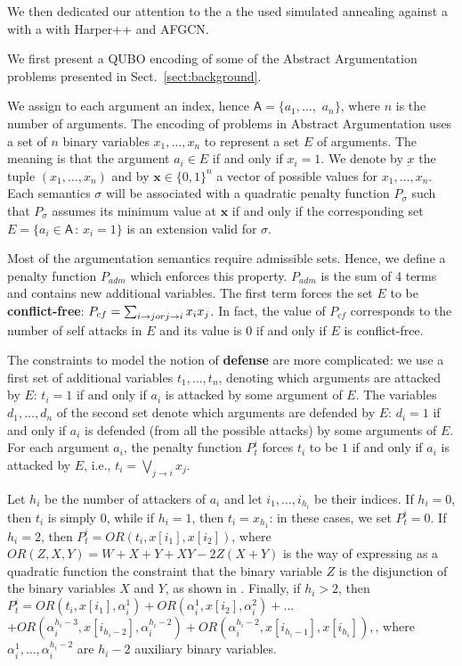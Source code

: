 \documentclass[conference]{IEEEtran}
\newcommand{\args}{\ensuremath{\mathsf{A}}\xspace} %
\newcommand{\atts}{\ensuremath{\rightarrow}\xspace}
\begin{document}
We then dedicated our attention to the 
 a the used simulated annealing against a with a with Harper++ and AFGCN. 

\iffalse
We first present a QUBO encoding of some of the Abstract Argumentation problems presented in Sect.~\ref{sect:background}. 

We assign to each argument an index, hence $\args=\{a_1,\dots,$ $a_n\}$, where $n$ is the number of arguments. The encoding of problems in Abstract Argumentation uses
a set of $n$ binary variables $x_1,\dots,x_n$ to represent a set $E$ of arguments.
The meaning is that the argument
$a_i\in E$ if and only if $x_i=1$. We denote by $\underbar{x}$ the tuple $(x_1,\dots,x_n)$
and by $\mathbf{x}\in\{0,1\}^n$ a vector of possible values for $x_1,\dots,x_n$.
Each semantics $\sigma$ will be associated with a quadratic penalty function $P_{\sigma}$ such that $P_{\sigma}$ assumes its minimum value at $\mathbf{x}$ if and only if the corresponding set $E=\{a_i\in \args \,:\, x_i=1\}$ is an extension valid for $\sigma$. 

Most of the argumentation semantics require admissible sets. Hence, we define a penalty function $P_{adm}$ which enforces this property. $P_{adm}$ is the sum of 4 terms and contains new additional variables.
The first term forces the set $E$ to be \textbf{conflict-free}:
$ P_{cf}=\sum_{i \atts j \mbox{ or }\\
	j \atts i} x_i x_j $. In fact, the value of $ P_{cf}$ corresponds to the number of self attacks in $E$
and its value is $0$ if and only if $E$ is conflict-free. 

The constraints to model the notion of \textbf{defense} are more complicated: we use a first set of additional variables $t_1,\dots,t_n$, denoting which arguments are attacked by $E$: $t_i=1$ if and only if $a_i$ is attacked by some argument of $E$. 
The variables $d_1,\dots,d_n$ of the second set denote which arguments are defended by $E$: $d_i=1$ if and only if $a_i$ is defended (from all the possible attacks) by some arguments of $E$. For each argument $a_i$, the penalty function $P_{t}^i$ forces $t_i$ to be $1$ if and only if $a_i$ is attacked by $E$, i.e.,
$t_i = \bigvee_{j \atts i} x_j$.

Let $h_i$ be the number of attackers of $a_i$ and let $i_1,\dots,i_{h_i}$ be
their indices. If $h_i=0$, then $t_i$ is simply $0$, while if $h_i=1$, then $t_i=x_{h_1}$:
in these cases, we set $P_{t}^i=0$.
If $h_i=2$, then $P_{t}^i=OR(t_i,x[i_1],x[i_2])$, where
$ OR(Z,X,Y)=W+X+Y+XY-2Z(X+Y)$
is the way of expressing as a quadratic function the constraint that the binary variable $Z$ is the disjunction of the binary variables $X$ and $Y$,
as shown in \cite{rosenberg}. Finally, if $h_i>2$, then
$ P_t^i=OR(t_i,x[i_1],\alpha_i^1)+OR(\alpha_i^1,x[i_2],\alpha_i^2)+\dots$
$ +OR(\alpha_i^{h_i-3},x[i_{h_i-2}],\alpha_i^{h_i-2})+
OR(\alpha_i^{h_i-2},x[i_{h_i-1}],x[i_{h_i}]), $, where $\alpha_i^1,\dots,\alpha_i^{h_i-2}$ are $h_i-2$ auxiliary binary variables.
\end{document}
